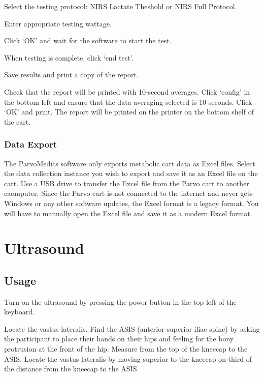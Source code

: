 \documentclass[
]{book}
\begin{document}
Select the testing protocol: NIRS Lactate Theshold or NIRS Full Protocol.

Enter appropriate testing wattage.

Click `OK' and wait for the software to start the test.

When testing is complete, click `end test'.

Save results and print a copy of the report.

Check that the report will be printed with 10-second averages. Click `config' in the bottom left and ensure that the data averaging selected is 10 seconds. Click `OK' and print. The report will be printed on the printer on the bottom shelf of the cart.

\hypertarget{Appendix-Instruments-Parvo-Usage-DataExport}{%
\subsubsection{Data Export}\label{Appendix-Instruments-Parvo-Usage-DataExport}}

The ParvoMedics software only exports metabolic cart data as Excel files. Select the data collection instance you wish to export and save it as an Excel file on the cart. Use a USB drive to transfer the Excel file from the Parvo cart to another caomputer. Since the Parvo cart is not connected to the internet and never gets Windows or any other software updates, the Excel format is a legacy format. You will have to manually open the Excel file and save it as a modern Excel format.

\hypertarget{Appendix-Instruments-Ultrasound}{%
\section{Ultrasound}\label{Appendix-Instruments-Ultrasound}}

\hypertarget{Appendix-Instruments-Ultrasound-Usage}{%
\subsection{Usage}\label{Appendix-Instruments-Ultrasound-Usage}}

Turn on the ultrasound by pressing the power button in the top left of the keyboard.

Locate the vastus lateralis. Find the ASIS (anterior superior iliac spine) by asking the participant to place their hands on their hips and feeling for the bony protrusion at the front of the hip. Measure from the top of the kneecap to the ASIS. Locate the vastus lateralis by moving superior to the kneecap on-third of the distance from the kneecap to the ASIS.
\end{document}
